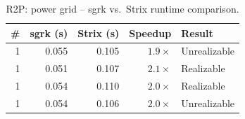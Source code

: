 \begin{table}[htbp]
\centering
\caption{R2P: power grid -- sgrk vs.\ Strix runtime comparison.}
\label{tab:R2P_power_grid}
\begin{tabular}{r r r r l}
\toprule
\# & sgrk (s) & Strix (s) & Speedup & Result \\
\midrule
1 & 0.055 & 0.105 & $1.9\times$ & Unrealizable \\
1 & 0.051 & 0.107 & $2.1\times$ & Realizable \\
1 & 0.054 & 0.110 & $2.0\times$ & Realizable \\
1 & 0.054 & 0.106 & $2.0\times$ & Unrealizable \\
\bottomrule
\end{tabular}
\end{table}
